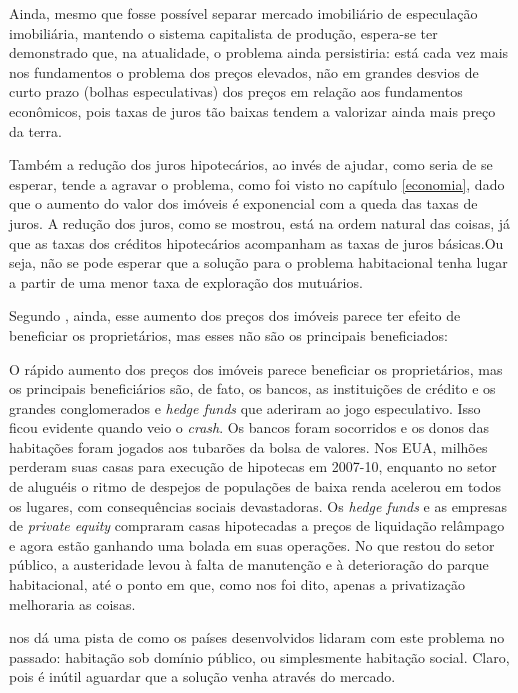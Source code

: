 \documentclass[
	12pt,				%
	oneside,			%
	a4paper,			%
	chapter=TITLE,		%
	section=TITLE,		%
	english,			%
	brazil				%
	]{abntex2}
\begin{document}
Ainda, mesmo que fosse possível separar mercado imobiliário de especulação
imobiliária, mantendo o sistema capitalista de produção, espera-se ter
demonstrado que, na atualidade, o problema ainda persistiria: está cada vez mais
nos fundamentos o problema dos preços elevados, não em grandes desvios de curto
prazo (bolhas especulativas) dos preços em relação aos fundamentos econômicos,
pois taxas de juros tão baixas tendem a valorizar ainda mais preço da terra.

Também a redução dos juros hipotecários, ao invés de ajudar, como seria de se
esperar, tende a agravar o problema, como foi visto no capítulo \ref{economia},
dado que o aumento do valor dos imóveis é exponencial com a queda das taxas de
juros. A redução dos juros, como se mostrou, está na ordem natural das
coisas, já que as taxas dos créditos hipotecários acompanham as taxas de juros
básicas.Ou seja, não se pode esperar que a solução para o problema habitacional
tenha lugar a partir de uma menor taxa de exploração dos mutuários.

Segundo \textcite{terraredonda}, ainda, esse aumento dos preços dos imóveis parece ter
efeito de beneficiar os proprietários, mas esses não são os principais
beneficiados:
\begin{citacao}
O rápido aumento dos preços dos imóveis parece beneficiar os proprietários, mas
os principais beneficiários são, de fato, os bancos, as instituições de crédito
e os grandes conglomerados e \emph{hedge funds} que aderiram ao jogo
especulativo.
Isso ficou evidente quando veio o \emph{crash}. Os bancos foram socorridos e os
donos das habitações foram jogados aos tubarões da bolsa de valores. Nos EUA,
milhões perderam suas casas para execução de hipotecas em 2007-10, enquanto no
setor de aluguéis o ritmo de despejos de populações de baixa renda acelerou em
todos os lugares, com consequências sociais devastadoras. Os \emph{hedge funds}
e as empresas de \emph{private equity} compraram casas hipotecadas a preços de
liquidação relâmpago e agora estão ganhando uma bolada em suas operações. No que
restou do setor público, a austeridade levou à falta de manutenção e à
deterioração do parque habitacional, até o ponto em que, como nos foi dito,
apenas a privatização melhoraria as coisas.
\end{citacao}
\textcite{terraredonda} nos dá uma pista de como os países desenvolvidos lidaram com este
problema no passado: habitação sob domínio público, ou simplesmente habitação
social. Claro, pois é inútil aguardar que a solução venha através do mercado.
\end{document}
